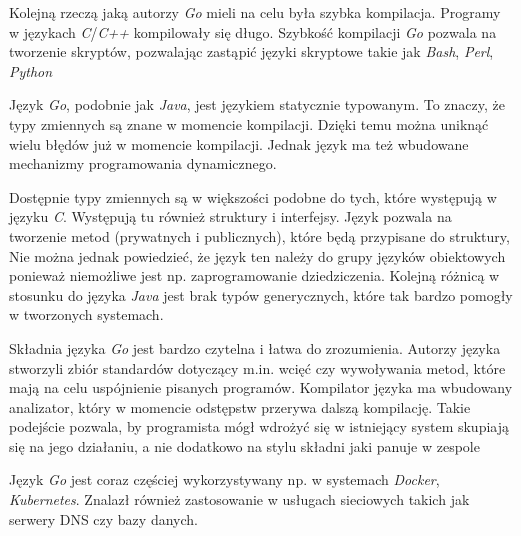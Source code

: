 Kolejną rzeczą jaką autorzy \textsl{Go} mieli na celu była szybka kompilacja. Programy w językach \textsl{C}/\textsl{C++} kompilowały się długo. Szybkość kompilacji \textsl{Go} pozwala na tworzenie skryptów, pozwalając zastąpić języki skryptowe takie jak \textsl{Bash}, \textsl{Perl}, \textsl{Python}

Język \textsl{Go}, podobnie jak \textsl{Java}, jest językiem statycznie typowanym. To znaczy, że typy zmiennych są znane w momencie kompilacji. Dzięki temu można uniknąć wielu błędów już w momencie kompilacji. Jednak język ma też wbudowane mechanizmy programowania dynamicznego. 

Dostępnie typy zmiennych są w większości podobne do tych, które występują w języku \textsl{C}. Występują tu również struktury i interfejsy. Język pozwala na tworzenie metod (prywatnych i publicznych), które będą przypisane do struktury, Nie można jednak powiedzieć, że język ten należy do grupy języków obiektowych ponieważ niemożliwe jest np. zaprogramowanie dziedziczenia. Kolejną różnicą w stosunku do języka \textsl{Java} jest brak typów generycznych, które tak bardzo pomogły w tworzonych systemach.
 
Składnia języka \textsl{Go} jest bardzo czytelna i łatwa do zrozumienia. Autorzy języka stworzyli zbiór standardów dotyczący m.in. wcięć czy wywoływania metod, które mają na celu uspójnienie pisanych programów. Kompilator języka ma wbudowany analizator, który w momencie odstępstw przerywa dalszą kompilację. Takie podejście pozwala, by programista mógł wdrożyć się w istniejący system skupiają się na jego działaniu, a nie dodatkowo na stylu składni jaki panuje w zespole

Język \textsl{Go} jest coraz częściej wykorzystywany np. w systemach  \textsl{Docker}, \textsl{Kubernetes}. Znalazł również zastosowanie w usługach sieciowych takich jak serwery DNS czy bazy danych.